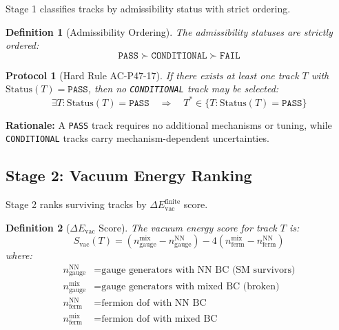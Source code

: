 \documentclass[11pt,a4paper]{article}
\newtheorem{definition}{Definition}[section]
\newtheorem{protocol}{Protocol}[section]
\begin{document}
Stage 1 classifies tracks by admissibility status with strict ordering.

\begin{definition}[Admissibility Ordering]
\label{def:admissibility-order}
The admissibility statuses are strictly ordered:
\begin{equation}
\label{eq:admissibility-order}
\texttt{PASS} \succ \texttt{CONDITIONAL} \succ \texttt{FAIL}
\end{equation}
\end{definition}

\begin{protocol}[Hard Rule AC-P47-17]
\label{prot:ac-p47-17}
If there exists at least one track $T$ with $\text{Status}(T) = \texttt{PASS}$,
then no \texttt{CONDITIONAL} track may be selected:
\begin{equation}
\label{eq:ac-p47-17}
\exists T : \text{Status}(T) = \texttt{PASS} \quad \Rightarrow \quad T^* \in \{T : \text{Status}(T) = \texttt{PASS}\}
\end{equation}
\end{protocol}

\textbf{Rationale:} A \texttt{PASS} track requires no additional mechanisms or tuning,
while \texttt{CONDITIONAL} tracks carry mechanism-dependent uncertainties.

\subsection{Stage 2: Vacuum Energy Ranking}
\label{subsec:stage2}

Stage 2 ranks surviving tracks by $\Delta E_{\text{vac}}^{\text{finite}}$ score.

\begin{definition}[$\Delta E_{\text{vac}}$ Score]
\label{def:evac-score}
The vacuum energy score for track $T$ is:
\begin{equation}
\label{eq:evac-score}
S_{\text{vac}}(T) = \left(n_{\text{gauge}}^{\text{mix}} - n_{\text{gauge}}^{\text{NN}}\right)
- 4 \left(n_{\text{ferm}}^{\text{mix}} - n_{\text{ferm}}^{\text{NN}}\right)
\end{equation}
where:
\begin{align}
\label{eq:evac-gauge}
n_{\text{gauge}}^{\text{NN}} &= \text{gauge generators with NN BC (SM survivors)} \\
\label{eq:evac-gauge-mix}
n_{\text{gauge}}^{\text{mix}} &= \text{gauge generators with mixed BC (broken)} \\
\label{eq:evac-ferm-nn}
n_{\text{ferm}}^{\text{NN}} &= \text{fermion dof with NN BC} \\
\label{eq:evac-ferm-mix}
n_{\text{ferm}}^{\text{mix}} &= \text{fermion dof with mixed BC}
\end{align}
\end{definition}
\end{document}
